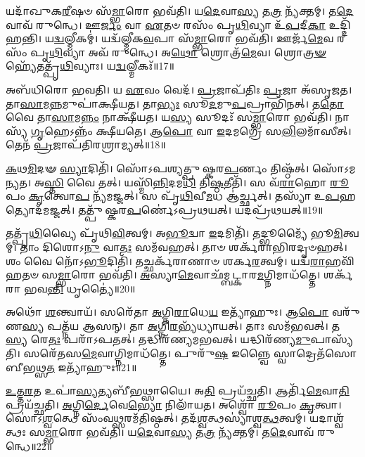 𑌯𑌦𑌾᳴𑌖𑍁𑌕\-\ul{𑌰𑍀}\-𑌷𑍞 𑌸᳴\-\ul{𑌮𑍍𑌭𑌾}\-𑌰𑍋 𑌭𑌵᳴𑌤𑌿।
𑌯\-\ul{𑌦𑍇}\-𑌵𑌾\-\ul{𑌸𑍍𑌯} 𑌤\-\ul{𑌤𑍍𑌰} 𑌨𑍍𑌯᳴𑌕𑍍𑌤𑌮𑍍।
𑌤\-\ul{𑌦𑍇}\-𑌵𑌾𑌵᳴ 𑌰𑍁𑌨𑍍𑌧𑍇।
𑌊\-\ul{𑌰𑍍𑌜𑌂} 𑌵𑌾 \ul{𑌏}\-𑌤𑍞 𑌰𑌸𑌂᳴ 𑌪𑍃\-\ul{𑌥𑌿}\-𑌵𑍍𑌯𑌾 𑌉᳴\-\ul{𑌪}\-𑌦𑍀\-\ul{𑌕𑌾} 𑌉𑌦𑍍𑌦𑌿᳴𑌹𑌨𑍍𑌤𑌿।
𑌯\-\ul{𑌦𑍍𑌵}\-𑌲𑍍𑌮𑍀𑌕𑌮𑍍॑।
𑌯𑌦𑍍𑌵᳴𑌲𑍍𑌮𑍀𑌕\-\ul{𑌵}\-𑌪𑌾 𑌸᳴\-\ul{𑌮𑍍𑌭𑌾}\-𑌰𑍋 𑌭𑌵᳴𑌤𑌿।
𑌊𑌰𑍍𑌜᳴\-\ul{𑌮𑍇}\-𑌵 𑌰𑌸𑌂᳴ 𑌪𑍃\-\ul{𑌥𑌿}\-𑌵𑍍𑌯𑌾 𑌅𑌵᳴ 𑌰𑍁𑌨𑍍𑌧𑍇।
𑌅\-\ul{𑌥𑍋} 𑌶𑍍𑌰𑍋𑌤𑍍𑌰᳴\-\ul{𑌮𑍇}\-𑌵।
𑌶𑍍𑌰𑍋\-\ul{𑌤𑍍𑌰}\-\-\ul{𑍟} 𑌹𑍍𑌯𑍇᳴𑌤𑌤𑍍𑌪𑍃᳴\-\ul{𑌥𑌿}\-𑌵𑍍𑌯𑌾𑌃।
𑌯\-\ul{𑌦𑍍𑌵}\-𑌲𑍍𑌮𑍀𑌕𑌃᳴॥17॥

𑌅𑌬᳴𑌧𑌿𑌰𑍋 𑌭𑌵𑌤𑌿।
𑌯 \ul{𑌏}\-𑌵𑌂 𑌵𑍇𑌦᳴।
\-\ul{𑌪𑍍𑌰}\-𑌜𑌾\-𑌪᳴𑌤𑌿𑌃 \ul{𑌪𑍍𑌰}\-𑌜𑌾 𑌅᳴\-𑌸𑍃𑌜𑌤।
𑌤𑌾\-\ul{𑌸𑌾}\-𑌮\-\ul{𑌨𑍍𑌨}\-𑌮𑍁𑌪𑌾॑𑌕𑍍𑌷𑍀𑌯𑌤।
𑌤𑌾\-\ul{𑌭𑍍𑌯𑌃} 𑌸𑍂\-\ul{𑌦}\-𑌮𑍁\-\ul{𑌪}\-𑌪𑍍𑌰𑌾𑌭𑌿᳴𑌨𑌤𑍍।
𑌤\-\ul{𑌤𑍋} 𑌵𑍈 𑌤𑌾\-\ul{𑌸𑌾}\-𑌮\-\ul{𑌨𑍍𑌨𑌂} 𑌨𑌾𑌕𑍍𑌷𑍀᳴𑌯𑌤।
𑌯\-\ul{𑌸𑍍𑌯} 𑌸𑍂𑌦𑌃᳴ 𑌸\-\ul{𑌮𑍍𑌭𑌾}\-𑌰𑍋 𑌭𑌵᳴𑌤𑌿।
𑌨𑌾𑌸𑍍𑌯᳴ \ul{𑌗𑍃}\-𑌹𑍇𑌽𑌨𑍍𑌨𑌂᳴ 𑌕𑍍𑌷𑍀𑌯𑌤𑍇।
𑌆\-\ul{𑌪𑍋} 𑌵𑌾 \ul{𑌇}\-𑌦𑌮𑌗𑍍𑌰𑍇᳴ 𑌸\-\ul{𑌲𑌿}\-𑌲𑌮𑌾᳴𑌸𑍀𑌤𑍍।
𑌤𑍇𑌨᳴ \ul{𑌪𑍍𑌰}\-𑌜𑌾𑌪᳴𑌤𑌿𑌰𑌶𑍍𑌰𑌾𑌮𑍍𑌯𑌤𑍍॥18॥

\-\ul{𑌕}\-𑌥\-\ul{𑌮𑌿}\-𑌦𑍟 \ul{𑌸𑍍𑌯𑌾}\-𑌦𑌿𑌤𑌿᳴।
𑌸𑍋᳴𑌽𑌪𑌶𑍍𑌯𑌤𑍍𑌪𑍁𑌷𑍍𑌕𑌰\-\ul{𑌪}\-𑌰𑍍𑌣𑌂 𑌤𑌿𑌷𑍍𑌠᳴𑌤𑍍।
𑌸𑍋᳴𑌽𑌮𑌨𑍍𑌯𑌤।
𑌅\-\ul{𑌸𑍍𑌤𑌿} 𑌵𑍈 𑌤𑌤𑍍।
𑌯𑌸𑍍𑌮𑌿᳴\-\ul{𑌨𑍍𑌨𑌿}\-𑌦𑌮\-\ul{𑌧𑌿} 𑌤𑌿\-\ul{𑌷𑍍𑌠}\-𑌤𑍀𑌤𑌿᳴।
𑌸 𑌵᳴\-\ul{𑌰𑌾}\-𑌹𑍋 \ul{𑌰𑍂}\-𑌪𑌂 \ul{𑌕𑍃}\-𑌤𑍍𑌵𑍋\-\ul{𑌪} 𑌨𑍍𑌯᳴𑌮𑌜𑍍𑌜𑌤𑍍।
𑌸 𑌪𑍃᳴\-\ul{𑌥𑌿}\-𑌵𑍀\-\ul{𑌮}\-𑌧 𑌆॑𑌰𑍍𑌚𑍍𑌛𑌤𑍍।
𑌤𑌸𑍍𑌯𑌾᳴ 𑌉\-\ul{𑌪}\-𑌹𑌤𑍍𑌯𑍋𑌦᳴𑌮𑌜𑍍𑌜𑌤𑍍।
𑌤𑌤𑍍𑌪𑍁᳴𑌷𑍍𑌕𑌰\-\ul{𑌪}\-𑌰𑍍𑌣𑍇॑\-𑌽𑌪𑍍𑌰𑌥𑌯𑌤𑍍।
𑌯𑌦𑌪𑍍𑌰᳴𑌥𑌯𑌤𑍍॥19॥

𑌤𑌤𑍍𑌪𑍃᳴\-\ul{𑌥𑌿}\-𑌵𑍍𑌯𑍈 𑌪𑍃᳴𑌥𑌿\-\ul{𑌵𑌿}\-𑌤𑍍𑌵𑌮𑍍।
𑌅\-\ul{𑌭𑍂}\-𑌦𑍍𑌵𑌾 \ul{𑌇}\-𑌦𑌮𑌿𑌤𑌿᳴।
𑌤𑌦𑍍𑌭𑍂𑌮𑍍𑌯𑍈᳴ 𑌭𑍂\-\ul{𑌮𑌿}\-𑌤𑍍𑌵𑌮𑍍।
𑌤𑌾𑌂 𑌦𑌿𑌶𑍋𑌽\-\ul{𑌨𑍁} 𑌵𑌾\-\ul{𑌤𑌃} 𑌸𑌮᳴𑌵𑌹𑌤𑍍।
𑌤𑌾𑍞 𑌶𑌰𑍍𑌕᳴𑌰𑌾𑌭𑌿𑌰𑌦𑍃𑍞𑌹𑌤𑍍।
𑌶𑌂 𑌵𑍈 𑌨𑍋᳴𑌽\-\ul{𑌭𑍂}\-𑌦𑌿𑌤𑌿᳴।
𑌤𑌚𑍍𑌛𑌰𑍍𑌕᳴𑌰𑌾𑌣𑌾𑍞 𑌶𑌰𑍍𑌕\-\ul{𑌰}\-𑌤𑍍𑌵𑌮𑍍।
𑌯𑌦𑍍𑌵᳴\-\ul{𑌰𑌾}\-𑌹𑌵𑌿᳴𑌹𑌤𑍞 𑌸\-\ul{𑌮𑍍𑌭𑌾}\-𑌰𑍋 𑌭𑌵᳴𑌤𑌿।
\-\ul{𑌅}\-𑌸𑍍𑌯𑌾\-\ul{𑌮𑍇}\-𑌵𑌾\-𑌛᳴𑌮𑍍𑌬𑌟𑍍𑌕𑌾𑌰\-\ul{𑌮}\-𑌗𑍍𑌨𑌿𑌮𑌾𑌧᳴𑌤𑍍𑌤𑍇।
𑌶𑌰𑍍𑌕᳴𑌰𑌾 𑌭𑌵\-\ul{𑌨𑍍𑌤𑌿} 𑌧𑍃𑌤𑍍𑌯𑍈॑॥20॥

𑌅𑌥𑍋᳴ \ul{𑌶}\-𑌨𑍍𑌤𑍍𑌵𑌾𑌯᳴।
𑌸𑌰𑍇᳴𑌤𑌾 \ul{𑌅}\-𑌗𑍍𑌨𑌿\-\ul{𑌰𑌾}\-𑌧𑍇\-\ul{𑌯} 𑌇𑌤𑍍𑌯𑌾᳴𑌹𑍁𑌃।
𑌆\-\ul{𑌪𑍋} 𑌵𑌰𑍁᳴𑌣\-\ul{𑌸𑍍𑌯} 𑌪𑌤𑍍𑌨᳴𑌯 𑌆𑌸𑌨𑍍।
𑌤𑌾 \ul{𑌅}\-𑌗𑍍𑌨𑌿\-\ul{𑌰}\-𑌭𑍍𑌯᳴𑌧𑍍𑌯𑌾𑌯𑌤𑍍।
𑌤𑌾𑌃 𑌸𑌮᳴𑌭𑌵𑌤𑍍।
𑌤\-\ul{𑌸𑍍𑌯} 𑌰𑍇\-\ul{𑌤𑌃} 𑌪𑌰𑌾᳴𑌽𑌪𑌤𑌤𑍍।
𑌤𑌦𑍍𑌧𑌿𑌰᳴𑌣𑍍𑌯𑌮𑌭𑌵𑌤𑍍।
𑌯𑌦𑍍𑌧𑌿𑌰᳴𑌣𑍍𑌯\-\ul{𑌮𑍁}\-𑌪𑌾𑌸𑍍𑌯᳴𑌤𑌿।
𑌸𑌰𑍇᳴𑌤𑌸\-\ul{𑌮𑍇}\-𑌵𑌾𑌗𑍍𑌨𑌿𑌮𑌾𑌧᳴𑌤𑍍𑌤𑍇।
𑌪𑍁𑌰𑍁᳴\-\ul{𑌷} 𑌇𑌨𑍍𑌨𑍍𑌵𑍈 𑌸𑍍𑌵𑌾𑌦𑍍𑌰𑍇𑌤᳴𑌸𑍋 𑌬𑍀𑌭𑌥𑍍𑌸\-\ul{𑌤} 𑌇𑌤𑍍𑌯𑌾᳴𑌹𑍁𑌃॥21॥

\-\ul{𑌉}\-\-\ul{𑌤𑍍𑌤}\-\-\ul{𑌰}\-𑌤 𑌉𑌪𑌾॑\-\ul{𑌸𑍍𑌯}\-𑌤𑍍𑌯𑌬𑍀᳴𑌭𑌥𑍍𑌸𑌾𑌯𑍈।
𑌅\-\ul{𑌤𑌿} 𑌪𑍍𑌰𑌯᳴𑌚𑍍𑌛𑌤𑌿।
𑌆𑌰𑍍𑌤𑌿᳴\-\ul{𑌮𑍇}\-𑌵𑌾\-\ul{𑌤𑌿} 𑌪𑍍𑌰𑌯᳴𑌚𑍍𑌛𑌤𑌿।
\-\ul{𑌅}\-𑌗𑍍𑌨𑌿\-\ul{𑌰𑍍𑌦𑍇}\-𑌵𑍇\-\ul{𑌭𑍍𑌯𑍋} 𑌨𑌿𑌲𑌾᳴𑌯𑌤।
𑌅𑌶𑍍𑌵𑍋᳴ \ul{𑌰𑍂}\-𑌪𑌂 \ul{𑌕𑍃}\-𑌤𑍍𑌵𑌾।
𑌸𑍋॑𑌽\-\ul{𑌶𑍍𑌵}\-𑌤𑍍𑌥𑍇 𑌸𑌂᳴𑌵\-\ul{𑌥𑍍𑌸}\-𑌰𑌮᳴𑌤𑌿𑌷𑍍𑌠𑌤𑍍।
𑌤𑌦᳴\-\ul{𑌶𑍍𑌵}\-𑌤𑍍𑌥𑌸𑍍𑌯𑌾॑𑌶𑍍𑌵\-\ul{𑌤𑍍𑌥}\-𑌤𑍍𑌵𑌮𑍍।
𑌯𑌦𑌾𑌶𑍍𑌵᳴𑌤𑍍𑌥𑌃 𑌸\-\ul{𑌮𑍍𑌭𑌾}\-𑌰𑍋 𑌭𑌵᳴𑌤𑌿।
𑌯\-\ul{𑌦𑍇}\-𑌵𑌾\-\ul{𑌸𑍍𑌯} 𑌤\-\ul{𑌤𑍍𑌰} 𑌨𑍍𑌯᳴𑌕𑍍𑌤𑌮𑍍।
𑌤\-\ul{𑌦𑍇}\-𑌵𑌾𑌵᳴ 𑌰𑍁𑌨𑍍𑌧𑍇॥22॥

